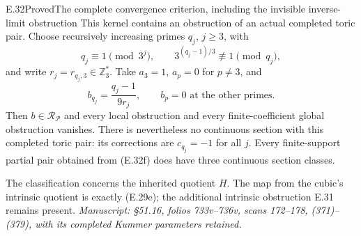 \begin{statement}{E.32}{Proved}{The complete convergence criterion, including the invisible inverse-limit obstruction}
This kernel contains an obstruction of an actual completed
toric pair. Choose recursively increasing primes $q_j$, $j\ge3$,
with
\[
 q_j\equiv1\pmod{3^j},\qquad
             3^{(q_j-1)/3}\not\equiv1\pmod{q_j},
\]
and write $r_j=r_{q_j,3}\in\mathbb Z_3^*$.
Take $a_3=1$, $a_p=0$ for $p\ne3$, and
\[
 b_{q_j}=\frac{q_j-1}{9r_j},\qquad b_p=0
              \text{ at the other primes}.                    \tag{E.32f}
\]
Then $b\in\mathcal R_{\mathcal P}$ and every local obstruction
and every finite-coefficient global obstruction vanishes.
There is nevertheless no continuous section with this completed
toric pair: its corrections are $c_{q_j}=-1$ for all $j$.
Every finite-support partial pair obtained from (E.32f) does
have three continuous section classes.

The classification concerns the inherited quotient $H$.
The map from the cubic's intrinsic quotient is exactly (E.29e);
the additional intrinsic obstruction E.31 remains present.
\emph{Manuscript: \S51.16, folios 733v--736v, scans 172--178,
(371)--(379), with its completed Kummer parameters retained.}
\end{statement}
